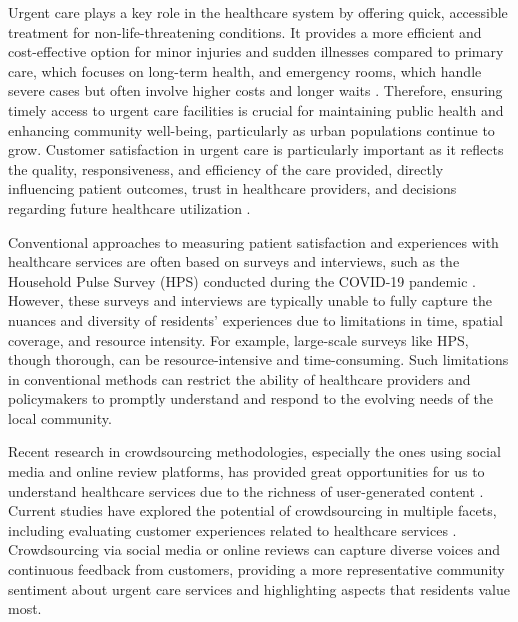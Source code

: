 \documentclass[journal,twoside,web]{ieeecolor}
\begin{document}
Urgent care plays a key role in the healthcare system by offering quick, accessible treatment for non-life-threatening conditions. It provides a more efficient and cost-effective option for minor injuries and sudden illnesses compared to primary care, which focuses on long-term health, and emergency rooms, which handle severe cases but often involve higher costs and longer waits \cite{weinick2009urgent}. Therefore, ensuring timely access to urgent care facilities is crucial for maintaining public health and enhancing community well-being, particularly as urban populations continue to grow. Customer satisfaction in urgent care is particularly important as it reflects the quality, responsiveness, and efficiency of the care provided, directly influencing patient outcomes, trust in healthcare providers, and decisions regarding future healthcare utilization \cite{qin2014ucperf,knowles2012patients}. 

Conventional approaches to measuring patient satisfaction and experiences with healthcare services \cite{al2014patient,howard2007patient} are often based on surveys and interviews, such as the Household Pulse Survey (HPS) conducted during the COVID-19 pandemic \cite{uscensus2024}. However, these surveys and interviews are typically unable to fully capture the nuances and diversity of residents’ experiences due to limitations in time, spatial coverage, and resource intensity. For example, large-scale surveys like HPS, though thorough, can be resource-intensive and time-consuming. Such limitations in conventional methods can restrict the ability of healthcare providers and policymakers to promptly understand and respond to the evolving needs of the local community.

Recent research in crowdsourcing methodologies, especially the ones using social media and online review platforms, has provided great opportunities for us to understand healthcare services due to the richness of user-generated content \cite{wang2020crowdsourcing,li2022dynamic}. Current studies have explored the potential of crowdsourcing in multiple facets, including evaluating customer experiences related to healthcare services \cite{bentan2024addressing}. Crowdsourcing via social media or online reviews can capture diverse voices and continuous feedback from customers, providing a more representative community sentiment about urgent care services and highlighting aspects that residents value most.
\end{document}
